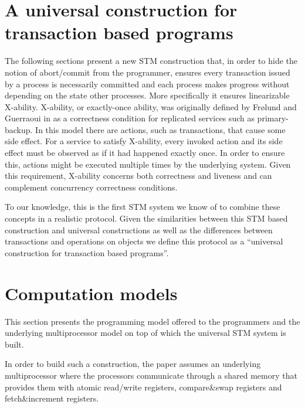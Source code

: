 \section{A universal construction for transaction based programs}

The following sections  present a  new STM construction  that,
in order to hide the notion of abort/commit from the programmer, ensures every  
transaction issued by a process is necessarily committed and  each process 
makes progress without depending on the state other processes.
More specifically it ensures linearizable X-ability.
X-ability, or exactly-once ability, was originally defined 
by Fr{\o}lund and Guerraoui in \cite{FG01}
as a correctness condition for replicated services such as
primary-backup.  In this model there are actions, such as
transactions, that cause some side effect.  For a service to satisfy
X-ability, every invoked action and its side effect must be observed as
if it had happened exactly once.  In order to ensure this, actions
might be executed multiple times by the underlying system.  Given this
requirement, X-ability concerns both correctness and liveness and can
complement concurrency correctness conditions.

To  our knowledge,  this  is the  first STM  system 
we  know of  to combine  these concepts in a realistic protocol.
Given the similarities between this STM based construction and universal
constructions as well as the differences between transactions and operations on objects
we define this protocol as a ``universal construction for transaction based programs''.


\section{Computation models}
\label{sec:models}

This section presents the programming model offered to the programmers
and  the underlying  multiprocessor model on top of which  the universal STM 
system is built. 

In order to build such a construction, the paper assumes an underlying 
multiprocessor where the processors  communicate through 
a shared memory that provides them with atomic read/write registers, 
compare\&swap registers and fetch\&increment registers. 

